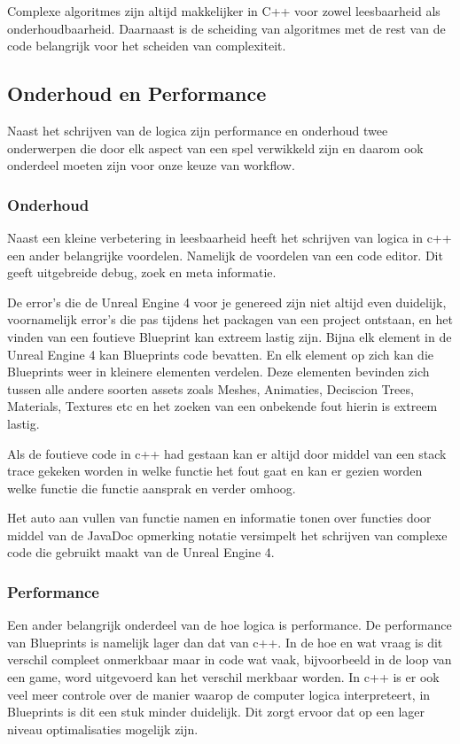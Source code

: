 Complexe algoritmes zijn altijd makkelijker in C++ voor zowel leesbaarheid als onderhoudbaarheid. Daarnaast is de scheiding van algoritmes met de rest van de code belangrijk voor het scheiden van complexiteit.

\subsection{Onderhoud en Performance}
Naast het schrijven van de logica zijn performance en onderhoud twee onderwerpen die door elk aspect van een spel verwikkeld zijn en daarom ook onderdeel moeten zijn voor onze keuze van workflow.

\subsubsection{Onderhoud}
Naast een kleine verbetering in leesbaarheid heeft het schrijven van logica in c++ een ander belangrijke voordelen. Namelijk de voordelen van een code editor. Dit geeft uitgebreide debug, zoek en meta informatie. 

De error’s die de Unreal Engine 4 voor je genereed zijn niet altijd even duidelijk, voornamelijk error’s die pas tijdens het packagen van een project ontstaan, en het vinden van een foutieve Blueprint kan extreem lastig zijn. Bijna elk element in de Unreal Engine 4 kan Blueprints code bevatten. En elk element op zich kan die Blueprints weer in kleinere elementen verdelen. Deze elementen bevinden zich tussen alle andere soorten assets zoals Meshes, Animaties, Deciscion Trees, Materials, Textures etc en het zoeken van een onbekende fout hierin is extreem lastig.

Als de foutieve code in c++ had gestaan kan er altijd door middel van een stack trace gekeken worden in welke functie het fout gaat en kan er gezien worden welke functie die functie aansprak en verder omhoog. 

Het auto aan vullen van functie namen en informatie tonen over functies door middel van de JavaDoc opmerking notatie versimpelt het schrijven van complexe code die gebruikt maakt van de Unreal Engine 4. 

\subsubsection{Performance}
Een ander belangrijk onderdeel van de hoe logica is performance. De performance van Blueprints is namelijk lager dan dat van c++. In de hoe en wat vraag is dit verschil compleet onmerkbaar maar in code wat vaak, bijvoorbeeld in de loop van een game, word uitgevoerd kan het verschil merkbaar worden.
In c++ is er ook veel meer controle over de manier waarop de computer logica interpreteert, in Blueprints is dit een stuk minder duidelijk. Dit zorgt ervoor dat op een lager niveau optimalisaties mogelijk zijn. 

